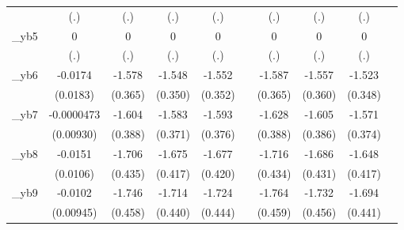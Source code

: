 \begin{table}[htbp]
\begin{tabular}{l*{9}{c}}
            &         (.)         &         (.)         &         (.)         &         (.)         &                     &         (.)         &         (.)         &         (.)         &                     \\
[1em]
\_yb5        &           0         &           0         &           0         &           0         &                     &           0         &           0         &           0         &                     \\
            &         (.)         &         (.)         &         (.)         &         (.)         &                     &         (.)         &         (.)         &         (.)         &                     \\
[1em]
\_yb6        &     -0.0174         &      -1.578\sym{***}&      -1.548\sym{***}&      -1.552\sym{***}&                     &      -1.587\sym{***}&      -1.557\sym{***}&      -1.523\sym{***}&                     \\
            &    (0.0183)         &     (0.365)         &     (0.350)         &     (0.352)         &                     &     (0.365)         &     (0.360)         &     (0.348)         &                     \\
[1em]
\_yb7        &  -0.0000473         &      -1.604\sym{***}&      -1.583\sym{***}&      -1.593\sym{***}&                     &      -1.628\sym{***}&      -1.605\sym{***}&      -1.571\sym{***}&                     \\
            &   (0.00930)         &     (0.388)         &     (0.371)         &     (0.376)         &                     &     (0.388)         &     (0.386)         &     (0.374)         &                     \\
[1em]
\_yb8        &     -0.0151         &      -1.706\sym{***}&      -1.675\sym{***}&      -1.677\sym{***}&                     &      -1.716\sym{***}&      -1.686\sym{***}&      -1.648\sym{***}&                     \\
            &    (0.0106)         &     (0.435)         &     (0.417)         &     (0.420)         &                     &     (0.434)         &     (0.431)         &     (0.417)         &                     \\
[1em]
\_yb9        &     -0.0102         &      -1.746\sym{***}&      -1.714\sym{***}&      -1.724\sym{***}&                     &      -1.764\sym{***}&      -1.732\sym{***}&      -1.694\sym{***}&                     \\
            &   (0.00945)         &     (0.458)         &     (0.440)         &     (0.444)         &                     &     (0.459)         &     (0.456)         &     (0.441)         &                     \\

\end{tabular}
\end{table}
